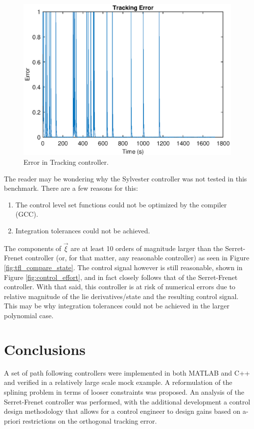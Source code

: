 \documentclass[oneside, 11pt]{book}
\begin{document}
\begin{figure}[!htbp]
    \centering
    \includegraphics{images/campus_tracking_error.eps}
    \caption{Error in Tracking controller.}
    \label{fig:mock_campus_tracking_error}
\end{figure}

The reader may be wondering why the Sylvester controller was not tested in this benchmark. There are a few reasons for this:
\begin{enumerate}
    \item The control level set functions could not be optimized by the compiler (GCC).
    \item Integration tolerances could not be achieved.
\end{enumerate}
The components of $\vec{\xi}$ are at least 10 orders of magnitude larger than the Serret-Frenet controller (or, for that matter, any reasonable controller) as seen in Figure \ref{fig:tfl_compare_state}. The control signal however is still reasonable, shown in Figure \ref{fig:control_effort}, and in fact closely follows that of the Serret-Frenet controller. With that said, this controller is at risk of numerical errors due to relative magnitude of the lie derivatives/state and the resulting control signal. This may be why integration tolerances could not be achieved in the larger polynomial case.

\section{Conclusions}
A set of path following controllers were implemented in both MATLAB and C++ and verified in a relatively large scale mock example. A reformulation of the splining problem in terms of looser constraints was proposed. An analysis of the Serret-Frenet controller was performed, with the additional development a control design methodology that allows for a control engineer to design gains based on a-priori restrictions on the orthogonal tracking error.
\end{document}
